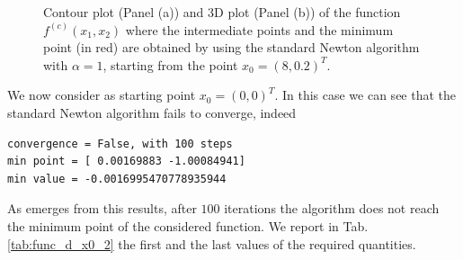 \documentclass[a4paper,11pt]{article}
\begin{document}
	\begin{figure}[H]
		\centering
		 \quad
		\caption{Contour plot (Panel (a)) and 3D plot (Panel (b)) of the function $f^{(c)}(x_{1},x_{2})$ where the intermediate points and the minimum point (in red) are obtained by using the standard Newton algorithm with $\alpha=1$, starting from the point $x_{0}=(8,0.2)^{T}$.}
		\label{Fig:func_d_x0_1}
	\end{figure}

\noindent We now consider as starting point $x_{0}=(0,0)^{T}$. In this case we can see that the standard Newton algorithm fails to converge, indeed
\begin{verbatim}
convergence = False, with 100 steps
min point = [ 0.00169883 -1.00084941]
min value = -0.0016995470778935944
\end{verbatim}
As emerges from this results, after $100$ iterations the algorithm does not reach the minimum point of the considered function. We report in Tab.\ref{tab:func_d_x0_2} the first and the last values of the required quantities.
\end{document}
